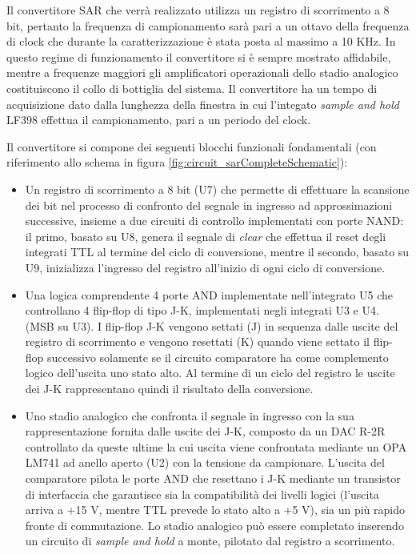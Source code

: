 \documentclass[journal]{IEEEtran}
\begin{document}
Il convertitore SAR che verrà realizzato utilizza un registro di scorrimento a 8 bit, pertanto la frequenza di campionamento sarà pari a un ottavo della frequenza di clock che durante la caratterizzazione è stata posta al massimo a 10 KHz. In questo regime di funzionamento il convertitore si è sempre mostrato affidabile, mentre a frequenze maggiori gli amplificatori operazionali dello stadio analogico costituiscono il collo di bottiglia del sistema. Il convertitore ha un tempo di acquisizione dato dalla lunghezza della finestra in cui l'integato \textit{sample and hold} LF398 effettua il campionamento, pari a un periodo del clock.

Il convertitore si compone dei seguenti blocchi funzionali fondamentali (con riferimento allo schema in figura \ref{fig:circuit_sarCompleteSchematic}):
\begin{itemize}
    \item Un registro di scorrimento a 8 bit (U7) che permette di effettuare la scansione dei bit nel processo di confronto del segnale in ingresso ad approssimazioni successive, insieme a due circuiti di controllo implementati con porte NAND: il primo, basato su U8, genera il segnale di \textit{clear} che effettua il reset degli integrati TTL al termine del ciclo di conversione, mentre il secondo, basato su U9, inizializza l'ingresso del registro all'inizio di ogni ciclo di conversione.
    \item Una logica comprendente 4 porte AND implementate nell'integrato U5 che controllano 4 flip-flop di tipo J-K, implementati negli integrati U3 e U4. (MSB su U3). I flip-flop J-K vengono settati (J) in sequenza dalle uscite del registro di scorrimento e vengono resettati (K) quando viene settato il flip-flop successivo solamente se il circuito comparatore ha come complemento logico dell'uscita uno stato alto. Al termine di un ciclo del registro le uscite dei J-K rappresentano quindi il risultato della conversione.
    \item Uno stadio analogico che confronta il segnale in ingresso con la sua rappresentazione fornita dalle uscite dei J-K, composto da un DAC R-2R controllato da queste ultime la cui uscita viene confrontata mediante un OPA LM741 ad anello aperto (U2) con la tensione da campionare. L'uscita del comparatore pilota le porte AND che resettano i J-K mediante un transistor di interfaccia che garantisce sia la compatibilità dei livelli logici (l'uscita arriva a +15 V, mentre TTL prevede lo stato alto a +5 V), sia un più rapido fronte di commutazione. Lo stadio analogico può essere completato inserendo un circuito di \textit{sample and hold} a monte, pilotato dal registro a scorrimento.
\end{itemize}
\end{document}

